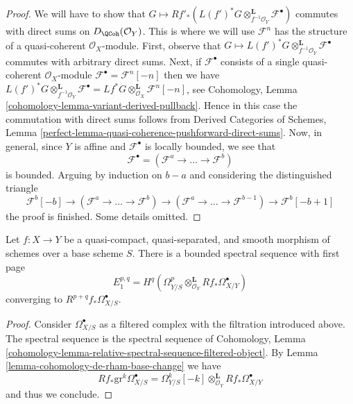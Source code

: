 \begin{proof}
\medskip\noindent
We will have to show that
$G \mapsto 
Rf'_*(L(f')^*G \otimes_{f^{-1}\mathcal{O}_Y}^\mathbf{L} \mathcal{F}^\bullet)$
commutes with direct sums on $D_\QCoh(\mathcal{O}_Y)$.
This is where we will use $\mathcal{F}^n$ has the structure
of a quasi-coherent $\mathcal{O}_X$-module. First, observe that
$G \mapsto L(f')^*G
\otimes_{f^{-1}\mathcal{O}_Y}^\mathbf{L} \mathcal{F}^\bullet$
commutes with arbitrary direct sums. Next, if
$\mathcal{F}^\bullet$ consists of a single quasi-coherent
$\mathcal{O}_X$-module $\mathcal{F}^\bullet = \mathcal{F}^n[-n]$
then we have $L(f')^*G
\otimes_{f^{-1}\mathcal{O}_Y}^\mathbf{L} \mathcal{F}^\bullet =
Lf^*G \otimes_{\mathcal{O}_X}^\mathbf{L} \mathcal{F}^n[-n]$, see
Cohomology, Lemma \ref{cohomology-lemma-variant-derived-pullback}.
Hence in this case the commutation with direct sums follows from
Derived Categories of Schemes, Lemma
\ref{perfect-lemma-quasi-coherence-pushforward-direct-sums}.
Now, in general, since $Y$ is affine and $\mathcal{F}^\bullet$
is locally bounded, we see that
$$
\mathcal{F}^\bullet = (\mathcal{F}^a \to \ldots \to \mathcal{F}^b)
$$
is bounded. Arguing by induction on $b - a$ and considering the
distinguished triangle
$$
\mathcal{F}^b[-b] \to (\mathcal{F}^a \to \ldots \to \mathcal{F}^b)
\to (\mathcal{F}^a \to \ldots \to \mathcal{F}^{b - 1}) \to
\mathcal{F}^b[-b + 1]
$$
the proof is finished. Some details omitted.
\end{proof}

\begin{lemma}
\label{lemma-spectral-sequence-smooth}
Let $f : X \to Y$ be a quasi-compact, quasi-separated, and smooth
morphism of schemes over a base scheme $S$. There is a bounded spectral
sequence with first page
$$
E_1^{p, q} =
H^q(\Omega^p_{Y/S} \otimes_{\mathcal{O}_Y}^\mathbf{L} Rf_*\Omega^\bullet_{X/Y})
$$
converging to $R^{p + q}f_*\Omega^\bullet_{X/S}$.
\end{lemma}

\begin{proof}
Consider $\Omega^\bullet_{X/S}$ as a filtered complex with the
filtration introduced above. The spectral sequence is the
spectral sequence of Cohomology, Lemma
\ref{cohomology-lemma-relative-spectral-sequence-filtered-object}.
By Lemma \ref{lemma-cohomology-de-rham-base-change} we have
$$
Rf_*\text{gr}^k\Omega^\bullet_{X/S} =
\Omega^k_{Y/S}[-k] \otimes_{\mathcal{O}_Y}^\mathbf{L} Rf_*\Omega^\bullet_{X/Y}
$$
and thus we conclude.
\end{proof}

